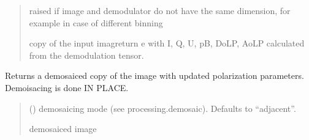 \documentclass[letterpaper,10pt,english]{sphinxmanual}
\begin{document}
\begin{fulllineitems}
\begin{fulllineitems}
\begin{quote}
\begin{description}
\begin{itemize}
\end{itemize}

\sphinxAtStartPar
{} \textendash{} raised if image and demodulator do not have the same dimension, for example in case of different binning

\sphinxAtStartPar
copy of the input imagreturn e with I, Q, U, pB, DoLP, AoLP calculated from the demodulation tensor.

\sphinxAtStartPar
{\hyperref[\detokenize{micropolarray:micropolarray.micropol_image.MicropolImage}]{}}

\end{description}\end{quote}

\end{fulllineitems}


\begin{fulllineitems}
\label{\detokenize{micropolarray:micropolarray.micropol_image.MicropolImage.demosaic}}
\pysigstartsignatures
{}
\pysigstopsignatures
\sphinxAtStartPar
Returns a demosaiced copy of the image with updated polarization parameters. Demoisacing is done IN PLACE.
\begin{quote}\begin{description}
\sphinxAtStartPar
{} (\sphinxstyleliteralemphasis{\sphinxupquote{, }}) \textendash{} demosaicing mode (see processing.demosaic). Defaults to “adjacent”.

\sphinxAtStartPar
demosaiced image

\sphinxAtStartPar
{\hyperref[\detokenize{micropolarray:micropolarray.micropol_image.MicropolImage}]{}}


\end{description}
\end{quote}
\end{fulllineitems}
\end{fulllineitems}
\end{document}
